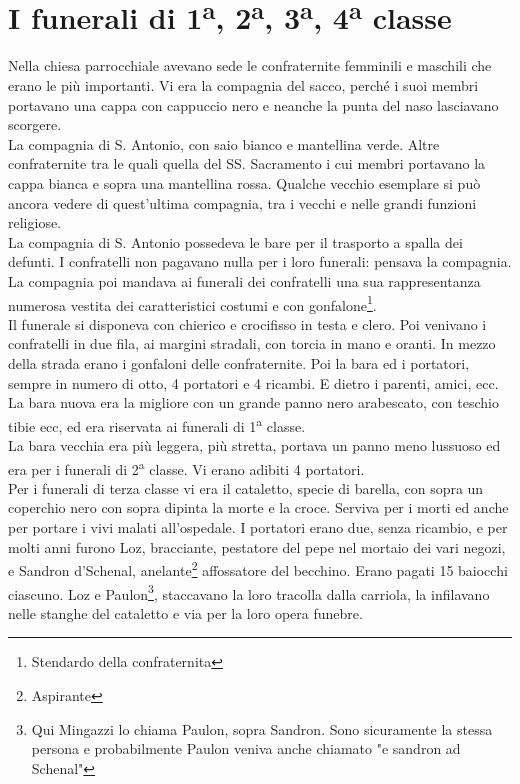
\chapter{I funerali di 1\textsuperscript{a}, 2\textsuperscript{a}, 3\textsuperscript{a}, 4\textsuperscript{a} classe}
Nella chiesa parrocchiale avevano sede le confraternite femminili e maschili che erano le più importanti. Vi era la compagnia del sacco, perché i suoi membri portavano una cappa con cappuccio nero e neanche la punta del naso lasciavano scorgere. \\
\indent La compagnia di S. Antonio, con saio bianco e mantellina verde. Altre confraternite tra le quali quella del SS. Sacramento i cui membri portavano la cappa bianca e sopra una mantellina rossa. Qualche vecchio esemplare si può ancora vedere di quest'ultima compagnia, tra i vecchi e nelle grandi funzioni religiose.\\
\indent La compagnia di S. Antonio possedeva le bare per il trasporto a spalla dei defunti. I confratelli non pagavano nulla per i loro funerali: pensava la compagnia. La compagnia poi mandava ai funerali dei confratelli una sua rappresentanza numerosa vestita dei caratteristici costumi e con gonfalone\footnote{Stendardo della confraternita}.\\
\indent Il funerale si disponeva con chierico e crocifisso in testa e clero. Poi venivano i confratelli in due fila, ai margini stradali, con torcia in mano e oranti. In mezzo della strada erano i gonfaloni delle confraternite. Poi la bara ed i portatori, sempre in numero di otto, 4 portatori e 4 ricambi. E dietro i parenti, amici, ecc. La bara nuova era la migliore con un grande panno nero arabescato, con teschio tibie ecc, ed era riservata ai funerali di 1\textsuperscript{a} classe. \\
\indent La bara vecchia era più leggera, più stretta, portava un panno meno lussuoso ed era per i funerali di 2\textsuperscript{a} classe. Vi erano adibiti 4 portatori.\\
\indent Per i funerali di terza classe vi era il cataletto, specie di barella, con sopra un coperchio nero con sopra dipinta la morte e la croce. Serviva per i morti ed anche per portare i vivi malati all'ospedale. I portatori erano due, senza ricambio, e per molti anni furono Loz, bracciante, pestatore del pepe nel mortaio dei vari negozi, e Sandron d'Schenal, anelante\footnote{Aspirante} affossatore del becchino. Erano pagati 15 baiocchi ciascuno. Loz e Paulon\footnote{Qui Mingazzi lo chiama Paulon, sopra Sandron. Sono sicuramente la stessa persona e probabilmente Paulon veniva anche chiamato "e sandron ad Schenal"}, staccavano la loro tracolla dalla carriola, la infilavano nelle stanghe del cataletto e via per la loro opera funebre.\\
